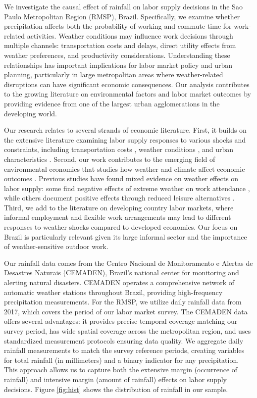 We investigate the causal effect of rainfall on labor supply decisions in the Sao Paulo Metropolitan Region (RMSP), Brazil. Specifically, we examine whether precipitation affects both the probability of working and commute time for work-related activities. Weather conditions may influence work decisions through multiple channels: transportation costs and delays, direct utility effects from weather preferences, and productivity considerations. Understanding these relationships has important implications for labor market policy and urban planning, particularly in large metropolitan areas where weather-related disruptions can have significant economic consequences. Our analysis contributes to the growing literature on environmental factors and labor market outcomes by providing evidence from one of the largest urban agglomerations in the developing world.

Our research relates to several strands of economic literature. First, it builds on the extensive literature examining labor supply responses to various shocks and constraints, including transportation costs \citep{zenou2009urban}, weather conditions \citep{connolly2008here}, and urban characteristics \citep{moretti2011local}. Second, our work contributes to the emerging field of environmental economics that studies how weather and climate affect economic outcomes \citep{hsiang2016climate}. Previous studies have found mixed evidence on weather effects on labor supply: some find negative effects of extreme weather on work attendance \citep{lee2016temperature}, while others document positive effects through reduced leisure alternatives \citep{connolly2008here}. Third, we add to the literature on developing country labor markets, where informal employment and flexible work arrangements may lead to different responses to weather shocks compared to developed economies. Our focus on Brazil is particularly relevant given its large informal sector and the importance of weather-sensitive outdoor work.

Our rainfall data comes from the Centro Nacional de Monitoramento e Alertas de Desastres Naturais (CEMADEN), Brazil's national center for monitoring and alerting natural disasters. CEMADEN operates a comprehensive network of automatic weather stations throughout Brazil, providing high-frequency precipitation measurements. For the RMSP, we utilize daily rainfall data from 2017, which covers the period of our labor market survey. The CEMADEN data offers several advantages: it provides precise temporal coverage matching our survey period, has wide spatial coverage across the metropolitan region, and uses standardized measurement protocols ensuring data quality. We aggregate daily rainfall measurements to match the survey reference periods, creating variables for total rainfall (in millimeters) and a binary indicator for any precipitation. This approach allows us to capture both the extensive margin (occurrence of rainfall) and intensive margin (amount of rainfall) effects on labor supply decisions. Figure \ref{fig:hist} shows the distribution of rainfall in our sample.

